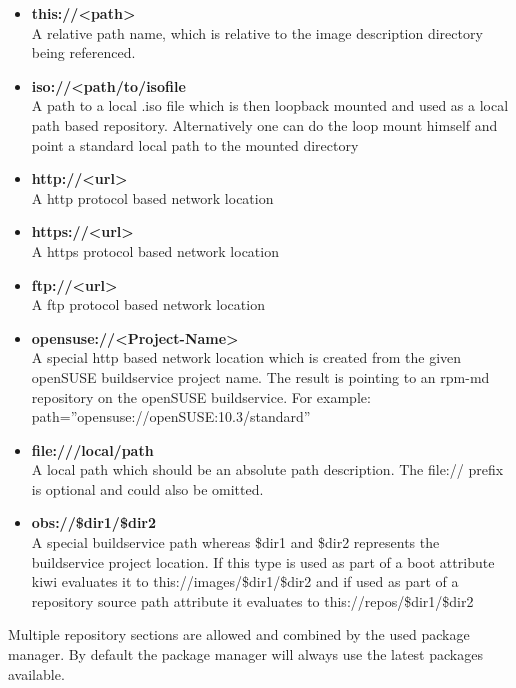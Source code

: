 \begin{itemize}
\item \textbf{this://<path>}\\
      A relative path name, which is relative to the image
      description directory being referenced.
\item \textbf{iso://<path/to/isofile}\\
      A path to a local .iso file which is then loopback mounted
      and used as a local path based repository. Alternatively one
      can do the loop mount himself and point a standard local path
      to the mounted directory
\item \textbf{http://<url>}\\
      A http protocol based network location
\item \textbf{https://<url>}\\
      A https protocol based network location
\item \textbf{ftp://<url>}\\
      A ftp protocol based network location
\item \textbf{opensuse://<Project-Name>}\\
      A special http based network location which is created from
      the given openSUSE buildservice project name. The result is
      pointing to an rpm-md repository on the openSUSE buildservice.
      For example:\\
      path=''opensuse://openSUSE:10.3/standard''
\item \textbf{file:///local/path}\\
      A local path which should be an absolute path description.
      The file:// prefix is optional and could also be omitted.
\item \textbf{obs://\$dir1/\$dir2}\\
      A special buildservice path whereas \$dir1 and \$dir2
      represents the buildservice project location. If this type is
      used as part of a boot attribute kiwi evaluates it to
      this://images/\$dir1/\$dir2 and if used as part of a repository
      source path attribute it evaluates to this://repos/\$dir1/\$dir2
\end{itemize}

Multiple repository sections are allowed and combined by the
used package manager. By default the package manager will always use
the latest packages available.

